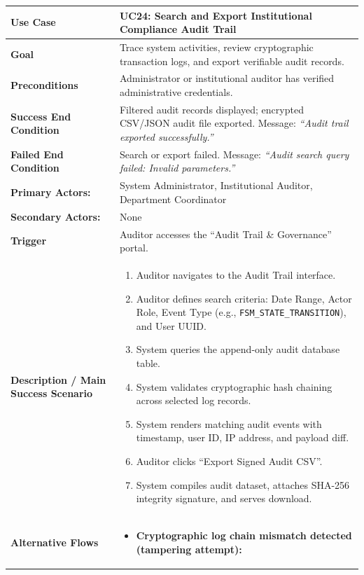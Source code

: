 \begin{table}[H]
\centering
\small
\begin{tabularx}{\textwidth}{|l|X|}
\hline
\rowcolor{lightgray!40} \textbf{Use Case} & \textbf{UC24: Search and Export Institutional Compliance Audit Trail} \\ \hline
\textbf{Goal} & Trace system activities, review cryptographic transaction logs, and export verifiable audit records. \\ \hline
\textbf{Preconditions} & Administrator or institutional auditor has verified administrative credentials. \\ \hline
\textbf{Success End Condition} & Filtered audit records displayed; encrypted CSV/JSON audit file exported. Message: \textit{``Audit trail exported successfully.''} \\ \hline
\textbf{Failed End Condition} & Search or export failed. Message: \textit{``Audit search query failed: Invalid parameters.''} \\ \hline
\textbf{Primary Actors:} & System Administrator, Institutional Auditor, Department Coordinator \\
\textbf{Secondary Actors:} & None \\ \hline
\textbf{Trigger} & Auditor accesses the ``Audit Trail \& Governance'' portal. \\ \hline
\textbf{Description / Main Success Scenario} &
\begin{enumerate}[leftmargin=*]
    \item Auditor navigates to the Audit Trail interface.
    \item Auditor defines search criteria: Date Range, Actor Role, Event Type (e.g., \texttt{FSM\_STATE\_TRANSITION}), and User UUID.
    \item System queries the append-only audit database table.
    \item System validates cryptographic hash chaining across selected log records.
    \item System renders matching audit events with timestamp, user ID, IP address, and payload diff.
    \item Auditor clicks ``Export Signed Audit CSV''.
    \item System compiles audit dataset, attaches SHA-256 integrity signature, and serves download.
\end{enumerate} \\ \hline
\textbf{Alternative Flows} &
\begin{itemize}[leftmargin=*]
    \item[\textbf{4.a.}] \textbf{Cryptographic log chain mismatch detected (tampering attempt):}

\end{itemize}
\end{tabularx}
\end{table}
